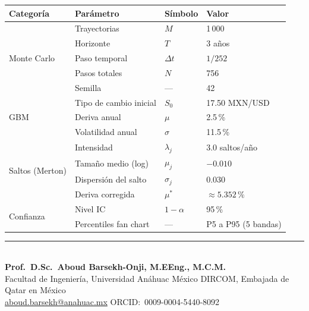 \documentclass[11pt,letterpaper]{article}
\begin{document}
\begin{center}
\begin{tabular}{@{}llll@{}}
\toprule
\textbf{Categoría} & \textbf{Parámetro} & \textbf{Símbolo} & \textbf{Valor} \\
\midrule
\multirow{5}{*}{Monte Carlo}
    & Trayectorias           & $M$           & 1\,000 \\
    & Horizonte              & $T$           & 3 años \\
    & Paso temporal          & $\Delta t$    & $1/252$ \\
    & Pasos totales          & $N$           & 756 \\
    & Semilla                & ---           & 42 \\
\midrule
\multirow{3}{*}{GBM}
    & Tipo de cambio inicial & $S_0$         & 17.50 MXN/USD \\
    & Deriva anual           & $\mu$         & 2.5\,\% \\
    & Volatilidad anual      & $\sigma$      & 11.5\,\% \\
\midrule
\multirow{4}{*}{Saltos (Merton)}
    & Intensidad             & $\lambda_j$   & 3.0 saltos/año \\
    & Tamaño medio (log)     & $\mu_j$       & $-0.010$ \\
    & Dispersión del salto   & $\sigma_j$    & $0.030$ \\
    & Deriva corregida       & $\mu^*$       & $\approx 5.352\,\%$ \\
\midrule
\multirow{2}{*}{Confianza}
    & Nivel IC               & $1-\alpha$    & 95\,\% \\
    & Percentiles fan chart  & ---           & P5 a P95 (5 bandas) \\
\bottomrule
\end{tabular}
\end{center}

\vfill
\begin{center}
{\color{anahuac}\rule{\linewidth}{0.5pt}}\\[0.2cm]
\small
\textbf{Prof.~D.Sc.~Aboud Barsekh-Onji, M.EEng., M.C.M.}\\
Facultad de Ingeniería, Universidad Anáhuac México \textbar{}
DIRCOM, Embajada de Qatar en México\\
\href{mailto:aboud.barsekh@anahuac.mx}{aboud.barsekh@anahuac.mx} \textbar{}
ORCID:~0009-0004-5440-8092
\end{center}
\end{document}
